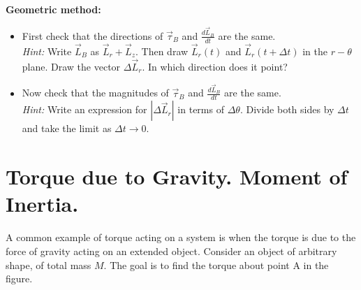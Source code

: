 \documentclass[11pt, letterpaper, openany]{book}
\newenvironment{exercise}[1][Exercise]{%
  \tcolorbox[blanker, breakable, left=1em,
    before skip=1em, after skip=1em,
    borderline west={3pt}{0pt}{PhysNavy},
    colback=PhysCream,
    before upper={\textcolor{PhysNavy}{\sffamily\bfseries #1:}\space}
  ]%
}{%
  \endtcolorbox%
}
\begin{document}
\begin{exercise}[Exercise 10]
\textbf{Geometric method:}
\begin{itemize}
    \item First check that the directions of $\vec{\tau}_B$ and $\frac{d\vec{L}_B}{dt}$ are the same. \\
    \textit{Hint:} Write $\vec{L}_B$ as $\vec{L}_r + \vec{L}_z$. Then draw $\vec{L}_r(t)$ and $\vec{L}_r(t + \Delta t)$ in the $r-\theta$ plane. Draw the vector $\Delta\vec{L}_r$. In which direction does it point?
    \item Now check that the magnitudes of $\vec{\tau}_B$ and $\frac{d\vec{L}_B}{dt}$ are the same. \\
    \textit{Hint:} Write an expression for $|\Delta\vec{L}_r|$ in terms of $\Delta\theta$. Divide both sides by $\Delta t$ and take the limit as $\Delta t \to 0$.
\end{itemize}
\end{exercise}

\chapter{Torque due to Gravity. Moment of Inertia.}

A common example of torque acting on a system is when the torque is due to the force of gravity acting on an extended object. Consider an object of arbitrary shape, of total mass $M$. The goal is to find the torque about point A in the figure.
\end{document}
